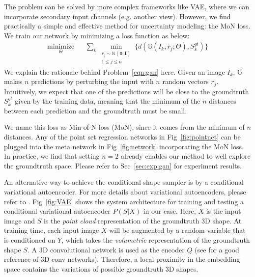 \documentclass[10pt,twocolumn,letterpaper]{article}
\begin{document}
The problem can be solved by more complex frameworks like VAE, where we can incorporate secondary input channels (e.g. another view). However, we find practically a simple and effective method for uncertainty modeling: the MoN loss. We train our network by minimizing a loss function as below:
\begin{equation}
    \begin{aligned}
    \underset{\Theta}{\mbox{minimize}} 
    && 
    \sum_k 
        \min_{
            \substack{r_j\sim \mathbb{N}(\mathbf{0}, \mathbf{I})\\1\le j\le n}
        }
        \{
            d(\mathbb{G}(I_k, r_j;\Theta), S_k^{gt})
        \}
    \end{aligned} 
    \label{eqn:gan}
\end{equation}We explain the rationale behind Problem~\eqref{eqn:gan} here. Given an image $I_k$, $\mathbb{G}$ makes $n$ predictions by perturbing the input with $n$ random vectors $r_j$. Intuitively, we expect that one of the predictions will be close to the groundtruth $S_k^{gt}$ given by the training data, meaning that the minimum of the $n$ distances between each prediction and the groundtruth must be small. 

We name this loss as Min-of-N loss (MoN), since it comes from the minimum of $n$ distances. Any of the point set regression networks in Fig~\ref{fig:pointnet} can be plugged into the meta network in Fig~\ref{fig:network} incorporating the MoN loss. In practice, we find that setting $n=2$ already enables our method to well explore the groundtruth space.  Please refer to Sec~\ref{sec:exp:gan} for experiment results.

An alternative way to achieve the conditional shape sampler is by a conditional variational autoencoder. For more details about variational autoencoders, please refer to \cite{doersch2016tutorial}.  Fig~\ref{fig:VAE} shows the system architecture for training and testing a conditional variational autoencoder $P(S|X)$ in our case. Here, $X$ is the input image and $S$ is the \emph{point cloud} representation of the groundtruth 3D shape. At training time, each input image $X$ will be augmented by a random variable that is conditioned on $Y$, which takes the \emph{volumetric} representation of the groundtruth shape $S$. A 3D convolutional network is used as the encoder $Q$ (see \cite{maturana2015voxnet} for a good reference of 3D conv networks). Therefore, a local proximity in the embedding space contains the variations of possible groundtruth 3D shapes.
\end{document}
